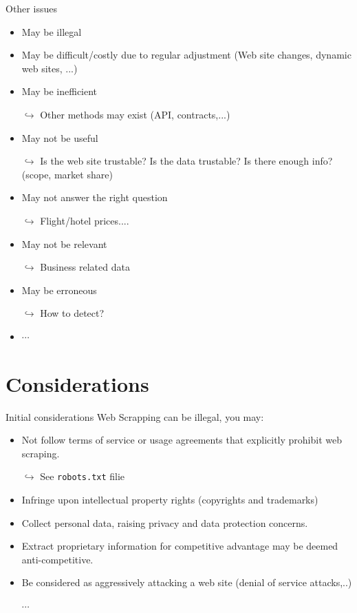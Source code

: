 \documentclass[xcolor=x11names,compress]{beamer}
\renewcommand{\(}{\begin{columns}}
\renewcommand{\)}{\end{columns}}
\newcommand{\<}[1]{\begin{column}{#1}}
\renewcommand{\>}{\end{column}}
\begin{document}
\begin{frame}{Other issues}
\pause
\begin{itemize}[<+->]
    \item May be illegal
    \item May be difficult/costly due to regular adjustment  (Web site changes, dynamic web sites, ...)
    \item May be inefficient
    \item[$\hookrightarrow$ ] Other methods may  exist (API, contracts,...)
    \item May not be useful
    \item[$\hookrightarrow$ ] Is the web site trustable? Is the data trustable?  Is there enough info? (scope, market share)
    \item May not answer the right question
    \item[$\hookrightarrow$ ] Flight/hotel prices....
     \item May not be relevant
    \item[$\hookrightarrow$ ] Business related data
    \item May be erroneous
    \item[$\hookrightarrow$ ]How to detect?
    \item $\cdots$
\end{itemize}
\end{frame}



\section{Considerations}


\begin{frame}{Initial considerations}
Web Scrapping can be illegal, you may:
\pause
\begin{itemize}[<+->]
    \item Not follow terms of service or usage agreements that explicitly prohibit web scraping.
    \item[$\hookrightarrow$] See \texttt{robots.txt} filie
    \item Infringe upon intellectual property rights (copyrights and trademarks)
    \item Collect personal data, raising privacy and data protection concerns.
    \item Extract proprietary information for competitive advantage may be deemed anti-competitive.
    \item Be considered as aggressively attacking a web site  (denial of service attacks,..)
    \item[$\cdots$]
\end{itemize}
\end{frame}
\end{document}
